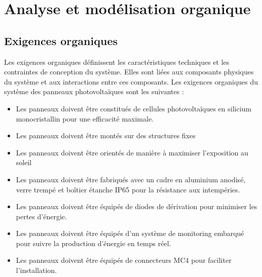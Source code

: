 \documentclass{article}
\begin{document}
\section{Analyse et modélisation organique}



\subsection{Exigences organiques}
Les exigences organiques définissent les caractéristiques techniques et les contraintes de conception du système. Elles sont liées aux composants physiques du système et aux interactions entre ces composants. Les exigences organiques du système des panneaux photovoltaïques sont les suivantes :
\begin{itemize}
    \item Les panneaux doivent être constitués de cellules photovoltaïques en silicium monocristallin pour une efficacité maximale.
    \item Les panneaux doivent être montés sur des structures fixes
    \item Les panneaux doivent être orientés de manière à maximiser l'exposition au soleil
    \item Les panneaux doivent être fabriqués avec un cadre en aluminium anodisé, verre trempé et boîtier étanche IP65 pour la résistance aux intempéries.
    \item Les panneaux doivent être équipés de diodes de dérivation pour minimiser les pertes d'énergie.
    \item Les panneaux doivent être équipés d'un système de monitoring embarqué pour suivre la production d'énergie en temps réel.
    \item Les panneaux doivent être équipés de connecteurs MC4 pour faciliter l’installation.
\end{itemize}
\end{document}
